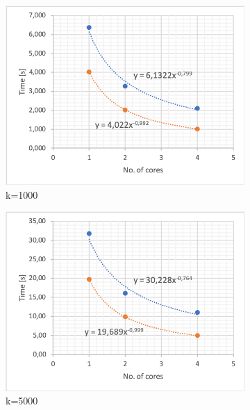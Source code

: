 \documentclass{article}
\begin{document}
\begin{figure}[h]
\centering
\begin{subfigure}{.49\textwidth}
  \centering
  \includegraphics[width=1\linewidth]{k1000.png}
  \caption{k=1000}
  \label{fig:foursub1}
\end{subfigure}%
\begin{subfigure}{.49\textwidth}
  \centering
  \includegraphics[width=1\linewidth]{k5000.png}
  \caption{k=5000}
  \label{fig:foursub2}
\end{subfigure}
\begin{subfigure}{.49\textwidth}
  \centering

\end{subfigure}
\end{figure}
\end{document}
